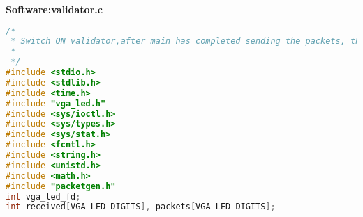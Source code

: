 \documentclass[twoside,12pt,fleqn]{book} %
\begin{document}
\newpage
\textbf{Software:validator.c}
\begin{lstlisting}[language=C]
/*
 * Switch ON validator,after main has completed sending the packets, this  * connects to the vga_led device and extracts all the information about t * he current status of the RAM's,based on which it extracts the packet fr * om each RAM. Now it also locally seeds itself with the encoded packet's * seed and then matches the information one by one till EOP((End of packe * t), at which stage it resets it's seed and waits for another packet.
 *
 */
#include <stdio.h>
#include <stdlib.h>
#include <time.h>
#include "vga_led.h"
#include <sys/ioctl.h>
#include <sys/types.h>
#include <sys/stat.h>
#include <fcntl.h>
#include <string.h>
#include <unistd.h>
#include <math.h>
#include "packetgen.h"
int vga_led_fd;
int received[VGA_LED_DIGITS], packets[VGA_LED_DIGITS];


\end{lstlisting}
\end{document}
